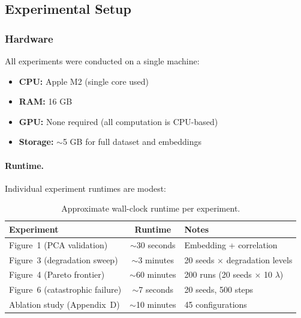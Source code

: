
\subsection{Experimental Setup}
\label{app:experimental_setup}

\subsubsection{Hardware}

All experiments were conducted on a single machine:

\begin{itemize}[leftmargin=*,noitemsep]
    \item \textbf{CPU:} Apple M2 (single core used)
    \item \textbf{RAM:} 16 GB
    \item \textbf{GPU:} None required (all computation is CPU-based)
    \item \textbf{Storage:} $\sim$5 GB for full dataset and embeddings
\end{itemize}

\paragraph{Runtime.}
Individual experiment runtimes are modest:

\begin{table}[h]
\centering
\caption{Approximate wall-clock runtime per experiment.}
\label{tab:runtimes}
\small
\begin{tabular}{@{}lcl@{}}
\toprule
\textbf{Experiment} & \textbf{Runtime} & \textbf{Notes} \\
\midrule
Figure~1 (PCA validation) & $\sim$30 seconds & Embedding + correlation \\
Figure~3 (degradation sweep) & $\sim$3 minutes & 20 seeds $\times$ degradation levels \\
Figure~4 (Pareto frontier) & $\sim$60 minutes & 200 runs (20 seeds $\times$ 10 $\lambda$) \\
Figure~6 (catastrophic failure) & $\sim$7 seconds & 20 seeds, 500 steps \\
Ablation study (Appendix~D) & $\sim$10 minutes & 45 configurations \\
\bottomrule
\end{tabular}
\end{table}


